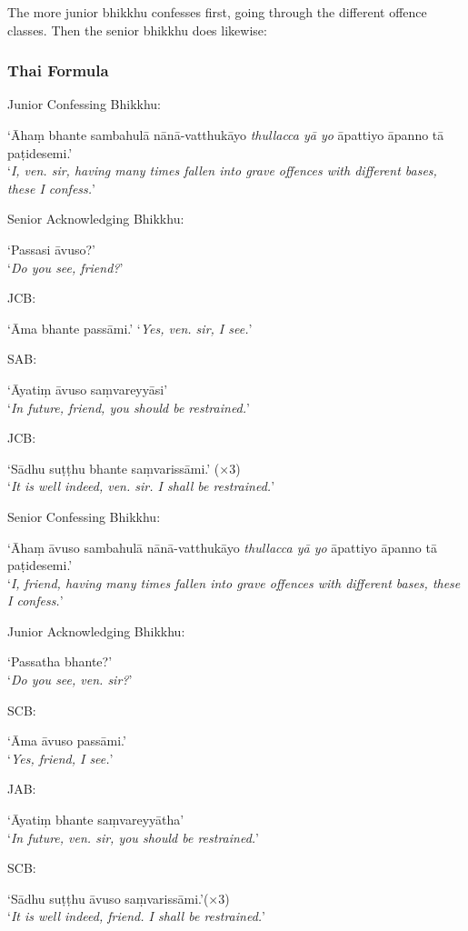 The more junior bhikkhu confesses first, going through the different offence
classes. Then the senior bhikkhu does likewise:

\subsubsection{Thai Formula}

Junior Confessing Bhikkhu:

‘Āhaṃ bhante sambahulā nānā-vatthukāyo \emph{thullacca yā yo} āpattiyo āpanno tā paṭidesemi.’\\
‘\emph{I, ven. sir, having many times fallen into grave offences with different bases, these I confess.}’

Senior Acknowledging Bhikkhu:

‘Passasi āvuso?’\\
‘\emph{Do you see, friend?}’

JCB:

‘Āma bhante passāmi.’
‘\emph{Yes, ven. sir, I see.}’

SAB:

‘Āyatiṃ āvuso saṃvareyyāsi’\\
‘\emph{In future, friend, you should be restrained.}’

JCB:

‘Sādhu suṭṭhu bhante saṃvarissāmi.’ (×3)\\
‘\emph{It is well indeed, ven. sir. I shall be restrained.}’

Senior Confessing Bhikkhu:

‘Āhaṃ āvuso sambahulā nānā-vatthukāyo \emph{thullacca yā yo} āpattiyo āpanno tā paṭidesemi.’\\
‘\emph{I, friend, having many times fallen into grave offences with different bases, these I confess.}’

Junior Acknowledging Bhikkhu:

‘Passatha bhante?’\\
‘\emph{Do you see, ven. sir?}’

SCB:

‘Āma āvuso passāmi.’\\
‘\emph{Yes, friend, I see.}’

JAB:

‘Āyatiṃ bhante saṃvareyyātha’\\
‘\emph{In future, ven. sir, you should be restrained.}’

SCB:

‘Sādhu suṭṭhu āvuso saṃvarissāmi.’(×3)\\
‘\emph{It is well indeed, friend. I shall be restrained.}’

